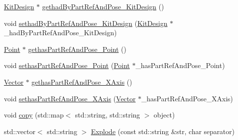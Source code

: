 \begin{DoxyCompactItemize}
\hyperlink{class_kit_design}{KitDesign} $\ast$ \hyperlink{class_part_ref_and_pose_ae6766d7594a8845f525ed0ac4f7c5dd6}{gethadByPartRefAndPose\_\-KitDesign} ()
\item 
void \hyperlink{class_part_ref_and_pose_a6f8e361754da90341dd124737fc15549}{sethadByPartRefAndPose\_\-KitDesign} (\hyperlink{class_kit_design}{KitDesign} $\ast$\_\-hadByPartRefAndPose\_\-KitDesign)
\item 
\hyperlink{class_point}{Point} $\ast$ \hyperlink{class_part_ref_and_pose_a9b53b53c06c35dc4e2aaa8c56bb9381a}{gethasPartRefAndPose\_\-Point} ()
\item 
void \hyperlink{class_part_ref_and_pose_af8191bff28deb6ffa6546588bc795e00}{sethasPartRefAndPose\_\-Point} (\hyperlink{class_point}{Point} $\ast$\_\-hasPartRefAndPose\_\-Point)
\item 
\hyperlink{class_vector}{Vector} $\ast$ \hyperlink{class_part_ref_and_pose_ae021fc8cda2cd2133780a0ad8788018a}{gethasPartRefAndPose\_\-XAxis} ()
\item 
void \hyperlink{class_part_ref_and_pose_a01212ebe047d654e38a3ffbddf013d7d}{sethasPartRefAndPose\_\-XAxis} (\hyperlink{class_vector}{Vector} $\ast$\_\-hasPartRefAndPose\_\-XAxis)
\item 
void \hyperlink{class_part_ref_and_pose_a0c5024f54e66320cb7b508326a192546}{copy} (std::map$<$ std::string, std::string $>$ object)
\item 
std::vector$<$ std::string $>$ \hyperlink{class_part_ref_and_pose_a86e17ee7dd3025e5c4c223177a6dd512}{Explode} (const std::string \&str, char separator)
\end{DoxyCompactItemize}


